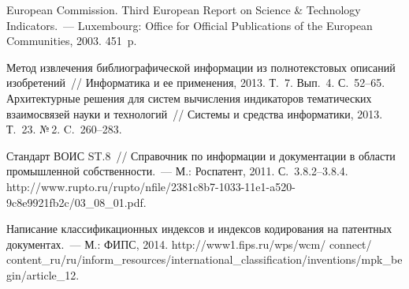 \begin{multicols}{2}
{{\begin{thebibliography}{99}
European Commission. Third European Report on Science \& Technology
Indicators.~--- Luxembourg: Office for Official Publications of the European
Communities, 2003. 451~p.



 Метод извлечения
библиографической информации из полнотекстовых описаний изобретений~//
Информатика и ее применения, 2013. Т.~7. Вып.~4. С.~52--65.
Архитектурные решения для сис\-тем вы\-чис\-ле\-ния индикаторов тематических
взаимосвязей науки и технологий~// Сис\-те\-мы и средства информатики, 2013.
Т.~23. №\,2. C.~260--283.



Стандарт ВОИС ST.8~// Справочник по информации и документации в области
промышленной собственности.~--- М.: Роспатент, 2011. С.~3.8.2--3.8.4. {\sf
http://www.rupto.ru/rupto/nfile/2381c8b7-1033-11e1-a520-9c8e9921fb2c/03\_08\_01.pdf}.

Написание классификационных индексов и индексов кодирования на патентных
документах.~--- М.: ФИПС, 2014. {\sf
http://www1.fips.ru/wps/wcm/\linebreak
connect/ content\_ru/ru/inform\_resources/international\_\linebreak classification/inventions/mpk\_begin/article\_12}.


\end{thebibliography}}}
\end{multicols}
